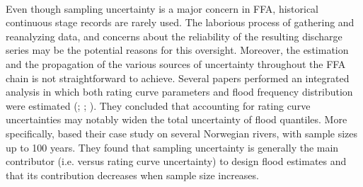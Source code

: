 \documentclass[11pt]{article}
\begin{document}
    \paragraph{}
    Even though sampling uncertainty is a major concern in FFA, historical continuous stage records are rarely used. The laborious process of gathering and reanalyzing data, and concerns about the reliability of the resulting discharge series may be the potential reasons for this oversight. Moreover, the estimation and the propagation of the various sources of uncertainty throughout the FFA chain is not straightforward to achieve. Several papers performed an integrated analysis in which both rating curve parameters and flood frequency distribution were estimated (\citet{petersen-overleir_accounting_2009}; \citet{steinbakk_propagation_2016}; \citet{vieira_assessing_2022}). They concluded that accounting for rating curve uncertainties may notably widen the total uncertainty of flood quantiles. More specifically, \citet{steinbakk_propagation_2016} based their case study on several Norwegian rivers, with sample sizes up to 100 years. They found that sampling uncertainty is generally the main contributor (i.e. versus rating curve uncertainty) to design flood estimates and that its contribution decreases when sample size increases.
\end{document}
